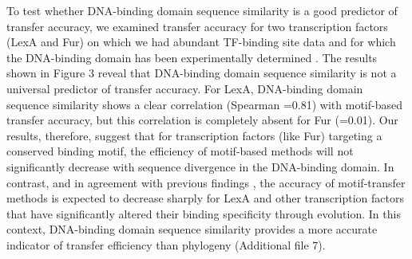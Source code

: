 To test whether DNA-binding domain sequence similarity is a good predictor of
transfer accuracy, we examined transfer accuracy for two transcription factors
(LexA and Fur) on which we had abundant TF-binding site data and for which the
DNA-binding domain has been experimentally determined
\cite{pohl2003architecture, zhang2010structure}. The results shown in Figure 3
reveal that DNA-binding domain sequence similarity is not a universal predictor
of transfer accuracy. For LexA, DNA-binding domain sequence similarity shows a
clear correlation (Spearman =0.81) with motif-based transfer accuracy, but this
correlation is completely absent for Fur (=0.01). Our results, therefore,
suggest that for transcription factors (like Fur) targeting a conserved binding
motif, the efficiency of motif-based methods will not significantly decrease
with sequence divergence in the DNA-binding domain. In contrast, and in
agreement with previous findings \cite{yu2004annotation}, the accuracy of
motif-transfer methods is expected to decrease sharply for LexA and other
transcription factors that have significantly altered their binding specificity
through evolution. In this context, DNA-binding domain sequence similarity
provides a more accurate indicator of transfer efficiency than phylogeny
(Additional file 7).

